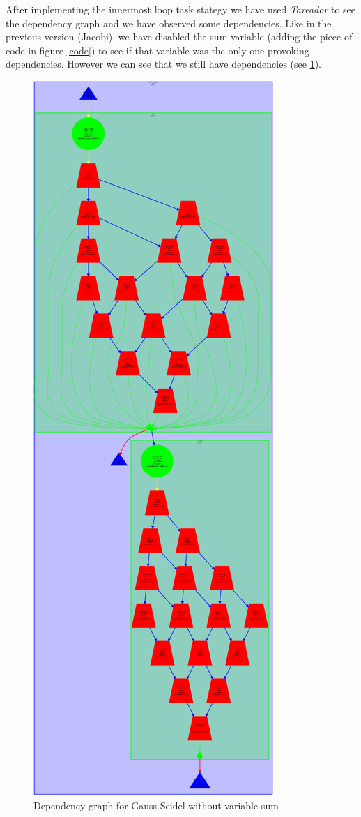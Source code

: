 \documentclass[12]{article}
\begin{document}
After implementing the innermost loop task stategy we have used \textit{Tareador} to see the dependency graph and we have observed some dependencies. Like in the previous version (Jacobi), we have disabled the sum variable (adding the piece of code in figure \ref{code}) to see if that variable was the only one provoking dependencies. However we can see that we still have dependencies (see \ref{Gauss_seidel_dependency2}). 

\begin{figure}[H]
    \centering
    \includegraphics[scale=0.30]{images/dependency_gauss2.png}
    \caption{Dependency graph for Gauss-Seidel without variable sum}
    \label{Gauss_seidel_dependency2}
\end{figure}
\end{document}
